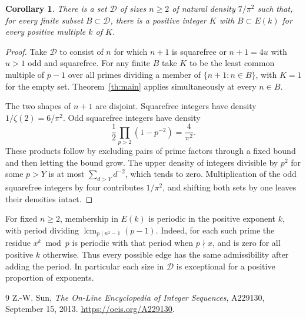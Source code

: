\documentclass[11pt]{article}
\newtheorem{corollary}[theorem]{Corollary}
\begin{document}
\begin{corollary}
There is a set $\mathcal D$ of sizes $n\ge2$ of natural density $7/\pi^2$ such that, for every finite subset $B\subset\mathcal D$, there is a positive integer $K$ with $B\subset E(k)$ for every positive multiple $k$ of $K$.
\end{corollary}
\begin{proof}
Take $\mathcal D$ to consist of $n$ for which $n+1$ is squarefree or $n+1=4u$ with $u>1$ odd and squarefree. For any finite $B$ take $K$ to be the least common multiple of $p-1$ over all primes dividing a member of $\{n+1:n\in B\}$, with $K=1$ for the empty set. Theorem~\ref{th:main} applies simultaneously at every $n\in B$.

The two shapes of $n+1$ are disjoint. Squarefree integers have density $1/\zeta(2)=6/\pi^2$. Odd squarefree integers have density
\[
    \frac12\prod_{p>2}(1-p^{-2})=\frac4{\pi^2}.
\]
These products follow by excluding pairs of prime factors through a fixed bound and then letting the bound grow. The upper density of integers divisible by $p^2$ for some $p>Y$ is at most $\sum_{d>Y}d^{-2}$, which tends to zero. Multiplication of the odd squarefree integers by four contributes $1/\pi^2$, and shifting both sets by one leaves their densities intact.
\end{proof}

For fixed $n\ge2$, membership in $E(k)$ is periodic in the positive exponent $k$, with period dividing $\operatorname{lcm}_{p\mid n^2-1}(p-1)$. Indeed, for each such prime the residue $x^k\bmod p$ is periodic with that period when $p\nmid x$, and is zero for all positive $k$ otherwise. Thus every possible edge has the same admissibility after adding the period. In particular each size in $\mathcal D$ is exceptional for a positive proportion of exponents.

\begin{thebibliography}{9}
 Z.-W. Sun, \emph{The On-Line Encyclopedia of Integer Sequences}, A229130, September 15, 2013. \url{https://oeis.org/A229130}.
\end{thebibliography}
\end{document}

